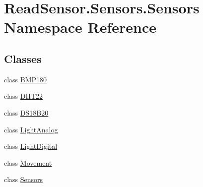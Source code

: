 \hypertarget{namespaceReadSensor_1_1Sensors_1_1Sensors}{}\section{Read\+Sensor.\+Sensors.\+Sensors Namespace Reference}
\label{namespaceReadSensor_1_1Sensors_1_1Sensors}
\subsection*{Classes}
\begin{DoxyCompactItemize}
\item 
class \hyperlink{classReadSensor_1_1Sensors_1_1Sensors_1_1BMP180}{B\+M\+P180}
\item 
class \hyperlink{classReadSensor_1_1Sensors_1_1Sensors_1_1DHT22}{D\+H\+T22}
\item 
class \hyperlink{classReadSensor_1_1Sensors_1_1Sensors_1_1DS18B20}{D\+S18\+B20}
\item 
class \hyperlink{classReadSensor_1_1Sensors_1_1Sensors_1_1LightAnalog}{Light\+Analog}
\item 
class \hyperlink{classReadSensor_1_1Sensors_1_1Sensors_1_1LightDigital}{Light\+Digital}
\item 
class \hyperlink{classReadSensor_1_1Sensors_1_1Sensors_1_1Movement}{Movement}
\item 
class \hyperlink{classReadSensor_1_1Sensors_1_1Sensors_1_1Sensors}{Sensors}
\end{DoxyCompactItemize}
